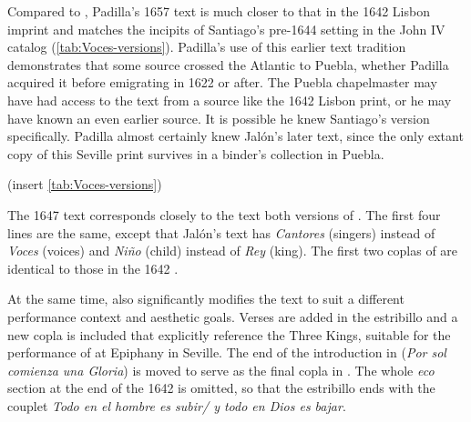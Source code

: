 Compared to , Padilla's 1657 text  is much
closer to that in the 1642 Lisbon imprint and matches the incipits of Santiago's
pre-1644 setting in the John IV catalog (\cref{tab:Voces-versions}).
Padilla's use of this earlier text tradition demonstrates that some source
crossed the Atlantic to Puebla, whether Padilla acquired it before emigrating in
1622 or after.
The Puebla chapelmaster may have had access to the text from a source like the 1642
Lisbon print, or he may have known an even earlier source.
It is possible he knew Santiago's version specifically.
Padilla almost certainly knew Jalón's later  text, since the only
extant copy of this Seville print survives in a binder's collection in Puebla.

(insert \cref{tab:Voces-versions})
\label{tab:Voces-versions}

The 1647  text corresponds closely to the text both versions of
.
The first four lines are the same, except that Jalón's text has \emph{Cantores}
(singers) instead of \emph{Voces} (voices) and \emph{Niño} (child) instead of \emph{Rey}
(king).
The first two coplas of  are identical to those in the 1642 .

At the same time,  also significantly modifies the text to suit a
different performance context and aesthetic goals.
Verses are added in the estribillo and a new copla is included that explicitly
reference the Three Kings, suitable for the performance of  at
Epiphany in Seville.
The end of the introduction in  (\emph{Por sol comienza una Gloria}) is
moved to serve as the final copla in .
The whole \emph{eco} section at the end of the 1642  is omitted, so that the
estribillo ends with the couplet \emph{Todo en el hombre es subir/ y todo en Dios es
bajar}.

